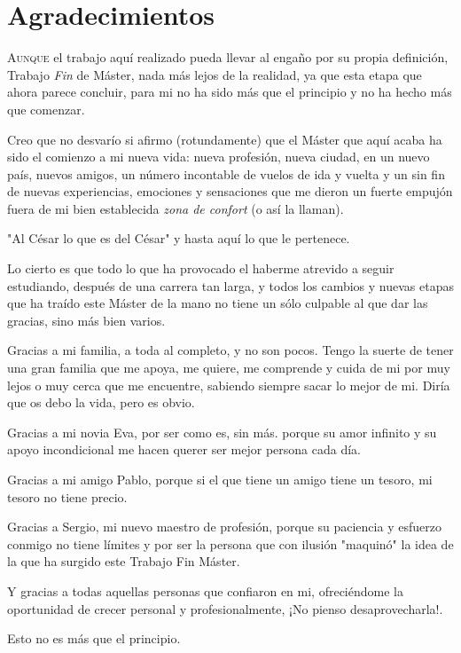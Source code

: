 \chapter*{Agradecimientos}
\pagestyle{empty}

\lettrine[lraise=-0.1, lines=2, loversize=0.25]{A}{unque} el trabajo aquí realizado pueda llevar al engaño por su propia definición, Trabajo \textit{Fin} de Máster, nada más lejos de la realidad, ya que esta etapa que ahora parece concluir, para mi no ha sido más que el principio y no ha hecho más que comenzar.

Creo que no desvarío si afirmo (rotundamente) que el Máster que aquí acaba ha sido el comienzo a mi nueva vida: nueva profesión, nueva ciudad, en un nuevo país, nuevos amigos, un número incontable de vuelos de ida y vuelta y un sin fin de nuevas experiencias, emociones y sensaciones que me dieron un fuerte empujón fuera de mi bien establecida \textit{zona de confort} (o así la llaman). 

"Al César lo que es del César" y hasta aquí lo que le pertenece. 

Lo cierto es que todo lo que ha provocado el haberme atrevido a seguir estudiando, después de una carrera tan larga, y todos los cambios y nuevas etapas que ha traído este Máster de la mano no tiene un sólo culpable al que dar las gracias, sino más bien varios.

Gracias a mi familia, a toda al completo, y no son pocos. Tengo la suerte de tener una gran familia que me apoya, me quiere, me comprende y cuida de mi por muy lejos o muy cerca que me encuentre, sabiendo siempre sacar lo mejor de mi. Diría que os debo la vida, pero es obvio.

Gracias a mi novia Eva, por ser como es, sin más. porque su amor infinito y su apoyo incondicional me hacen querer ser mejor persona cada día.

Gracias a mi amigo Pablo, porque si el que tiene un amigo tiene un tesoro, mi tesoro no tiene precio.

Gracias a Sergio, mi nuevo maestro de profesión, porque su paciencia y esfuerzo conmigo no tiene límites y por ser la persona que con ilusión "maquinó" la idea de la que ha surgido este Trabajo Fin Máster.

Y gracias a todas aquellas personas que confiaron en mi, ofreciéndome la oportunidad de crecer personal y profesionalmente, ¡No pienso desaprovecharla!. 

Esto no es más que el principio.

{}%
\vspace{-.3cm}
{}%